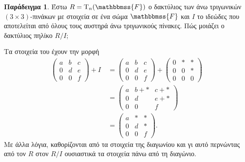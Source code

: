 \documentclass[12pt,a4paper,reqno]{amsart}
\theoremstyle{definition}
\newtheorem{example}[theorem]{Παράδειγμα}
\theoremstyle{remark}
\numberwithin{theorem}{section}
\numberwithin{exercise}{section}
\numberwithin{equation}{section}
\newcommand{\FF}{\mathbbmss{F}}
\newcommand{\rmT}{\mathrm{T}}
\begin{document}
\begin{example}
    \label{ex:quotient_ring}
    Έστω $R = \rmT_n(\FF)$ ο δακτύλιος των άνω τριγωνικών $(3\times3)$-πινάκων με στοιχεία σε ένα σώμα $\FF$ και $I$ το ιδεώδες που αποτελείται από όλους τους αυστηρά άνω τριγωνικούς πίνακες. Πώς μοιάζει ο δακτύλιος πηλίκο $R/I$;

    Τα στοιχεία του έχουν την μορφή 
    \begin{align*}
    \begin{pmatrix}
        a & b & c \\
        0 & d & e \\
        0 & 0 & f 
    \end{pmatrix} + I \ 
    &= \begin{pmatrix}
        a & b & c \\
        0 & d & e \\
        0 & 0 & f 
    \end{pmatrix} + 
    \begin{pmatrix}
        0 & \ast & \ast \\ 
        0 & 0 & \ast \\ 
        0 & 0 & 0
    \end{pmatrix} \\ 
    &= 
    \begin{pmatrix}
        a & b + \ast & c + \ast \\
        0 & d & e + \ast \\
        0 & 0 & f 
    \end{pmatrix} \\
    &= 
    \begin{pmatrix}
        a & \ast & \ast \\
        0 & d    & \ast \\
        0 & 0    & f 
    \end{pmatrix}. 
\end{align*}
Με άλλα λόγια, καθορίζονται από τα στοιχεία της διαγωνίου και γι αυτό περνώντας από τον $R$ στον $R/I$ ουσιαστικά  τα στοιχεία πάνω από τη διαγώνιο. 


\end{example}
\end{document}
